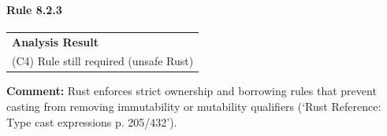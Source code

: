 \paragraph{Rule 8.2.3}
\begin{longtable}{p{13cm}}
\textbf{Analysis Result} \\
(C4) Rule still required (unsafe Rust) \\
\end{longtable}
\textbf{Comment:} Rust enforces strict ownership and borrowing rules that prevent casting from removing immutability or mutability qualifiers (`Rust Reference: Type cast expressions p. 205/432'). \\

